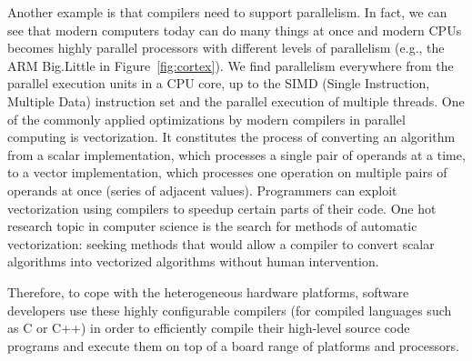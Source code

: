 Another example is that compilers need to support parallelism. In fact, we can see that modern computers today can do many things at once and modern CPUs becomes highly parallel processors with different levels of parallelism (e.g., the ARM Big.Little in Figure~\ref{fig:cortex}). We find parallelism everywhere from the parallel execution units in a CPU core, up to the SIMD (Single Instruction, Multiple Data) instruction set and the parallel execution of multiple threads.  One of the commonly applied optimizations by modern compilers in parallel computing is vectorization. It constitutes the process of converting an algorithm from a scalar implementation, which processes a single pair of operands at a time, to a vector implementation, which processes one operation on multiple pairs of operands at once (series of adjacent values).
Programmers can exploit vectorization using compilers to speedup certain parts of their code. One hot research topic in computer science is the search for methods of automatic vectorization\cite{nuzman2006auto}: seeking methods that would allow a compiler to convert scalar algorithms into vectorized algorithms without human intervention.


Therefore, to cope with the heterogeneous hardware platforms, software developers use these highly configurable compilers (for compiled languages such as C or C++) in order to efficiently compile their high-level source code programs and execute them on top of a board range of platforms and processors. 


